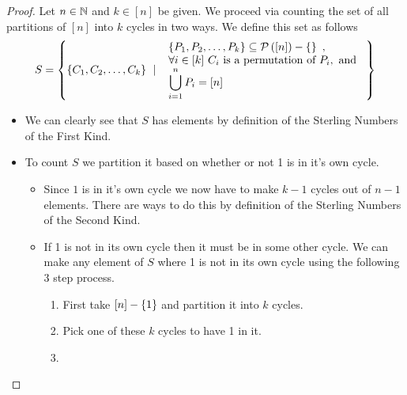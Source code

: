         \begin{proof}
            Let $n \in \mathbb{N}$ and $k \in [n]$ be given. We proceed via counting the set of all
            partitions of $[n]$ into $k$ cycles in two ways. We define this set as follows
            \[
                S = \left\{\left\{C_1, C_2, \dots, C_k\right\} \ \mid \
                        \begin{array}{l}
                            \left\{P_1, P_2, \dots, P_k\right\} \subseteq \mathcal{P}\left([n]\right) - \left\{\right\} \ , \\
                            \forall i \in [k] \ C_i \mbox{ is a permutation of } P_i, \mbox{ and } \\
                            \displaystyle\bigcup_{i = 1}^{n} P_i = [n]
                        \end{array}
                \right\}
            \]
            \begin{itemize}
                \item
                    We can clearly see that $S$ has  elements by definition
                    of the Sterling Numbers of the First Kind.
                \item
                    To count $S$ we partition it based on whether or not 1 is in it's
                    own cycle.
                    \begin{itemize}
                        \item
                            Since $1$ is in it's own cycle we now have to make $k - 1$
                            cycles out of $n - 1$ elements. There are 
                            ways to do this by definition of the Sterling Numbers of
                            the Second Kind.
                        \item
                            If 1 is not in its own cycle then it must be in some other cycle.
                            We can make any element of $S$ where 1 is not in its own cycle
                            using the following 3 step process.
                            \begin{enumerate}
                                \item
                                    First take $[n] - \left\{1\right\}$ and partition it
                                    into $k$ cycles.
                                \item
                                    Pick one of these $k$ cycles to have 1 in it.
                                \item

\end{enumerate}
\end{itemize}
\end{itemize}
\end{proof}
